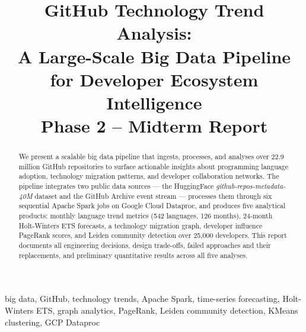 \documentclass[conference]{IEEEtran}
\begin{document}
\title{GitHub Technology Trend Analysis:\\
A Large-Scale Big Data Pipeline for Developer Ecosystem Intelligence\\
{\footnotesize Phase 2 -- Midterm Report}}

\author{
  \and
  \and
}

\maketitle

\begin{abstract}
We present a scalable big data pipeline that ingests, processes, and analyses
over 22.9 million GitHub repositories to surface actionable insights about
programming language adoption, technology migration patterns, and developer
collaboration networks. The pipeline integrates two public data sources — the
HuggingFace \textit{github-repos-metadata-40M} dataset and the GitHub Archive
event stream — processes them through six sequential Apache Spark jobs on
Google Cloud Dataproc, and produces five analytical products: monthly language
trend metrics (542 languages, 126 months), 24-month Holt-Winters ETS forecasts,
a technology migration graph, developer influence PageRank scores, and Leiden
community detection over 25,000 developers. This report documents all
engineering decisions, design trade-offs, failed approaches and their
replacements, and preliminary quantitative results across all five analyses.
\end{abstract}

\begin{IEEEkeywords}
big data, GitHub, technology trends, Apache Spark, time-series forecasting,
Holt-Winters ETS, graph analytics, PageRank, Leiden community detection,
KMeans clustering, GCP Dataproc
\end{IEEEkeywords}
\end{document}
